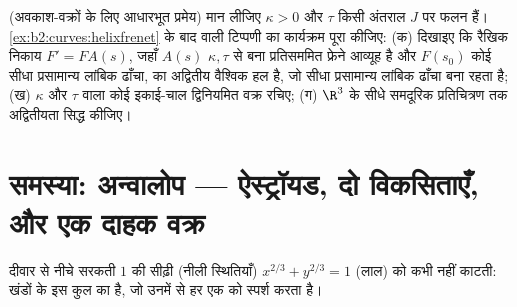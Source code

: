 \begin{exercise}[$\star\star\star$]\label{exo:b2:curves:12}
(अवकाश-वक्रों के लिए आधारभूत प्रमेय) मान लीजिए $\kappa > 0$ और
$\tau$ किसी अंतराल $J$ पर  फलन हैं।
\cref{ex:b2:curves:helixfrenet} के बाद वाली टिप्पणी का कार्यक्रम पूरा
कीजिए: (क) दिखाइए कि रैखिक निकाय $F' = FA(s)$, जहाँ $A(s)$ $\kappa, \tau$ से बना
प्रतिसममित फ्रेने आव्यूह है और $F(s_0)$ कोई सीधा प्रसामान्य लांबिक
ढाँचा, का अद्वितीय वैश्विक हल है, जो सीधा प्रसामान्य लांबिक ढाँचा
बना रहता है;
(ख)  $\kappa$ और  $\tau$ वाला कोई इकाई-चाल
द्विनियमित वक्र रचिए; (ग) $\R^3$ के सीधे समदूरिक प्रतिचित्रण तक
अद्वितीयता सिद्ध कीजिए।
\end{exercise}

\section{समस्या: अन्वालोप --- ऐस्ट्रॉयड, दो विकसिताएँ, और
एक दाहक वक्र}

\begin{omfigure}

{\small दीवार से नीचे सरकती  $1$ की सीढ़ी (नीली
स्थितियाँ)  $x^{2/3} + y^{2/3} = 1$ (लाल) को कभी नहीं
काटती:  खंडों के इस कुल का \emph{} है, जो उनमें से
हर एक को स्पर्श करता है।}
\end{omfigure}

